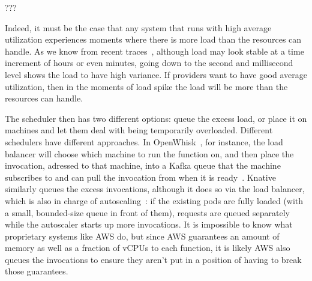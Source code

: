 ???



Indeed, it must be the case that any system that runs with high average
utilization experiences moments where there is more load than the resources can
handle. As we know from recent traces~\cite{prequal}, although load may look
stable at a time increment of hours or even minutes, going down to the second
and millisecond level shows the load to have high variance. If providers want to
have good average utilization, then in the moments of load spike the load will
be more than the resources can handle.

The scheduler then has two different options: queue the excess load, or place it
on machines and let them deal with being temporarily overloaded. Different
schedulers have different approaches. In OpenWhisk~\cite{openwhisk}, for
instance, the load balancer will choose which machine to run the function on,
and then place the invocation, adressed to that machine, into a Kafka queue that
the machine subscribes to and can pull the invocation from when it is
ready~\cite{openwhisk-sched}. Knative~\cite{knative} similarly queues the excess
invocations, although it does so via the load balancer, which is also in charge
of autoscaling~\cite{knative-sched}: if the existing pods are fully loaded (with
a small, bounded-size queue in front of them), requests are queued separately
while the autoscaler starts up more invocations. It is impossible to know what
proprietary systems like AWS do, but since AWS guarantees an amount of memory as
well as a fraction of vCPUs to each function, it is likely AWS also queues the
invocations to ensure they aren't put in a position of having to break those
guarantees.

